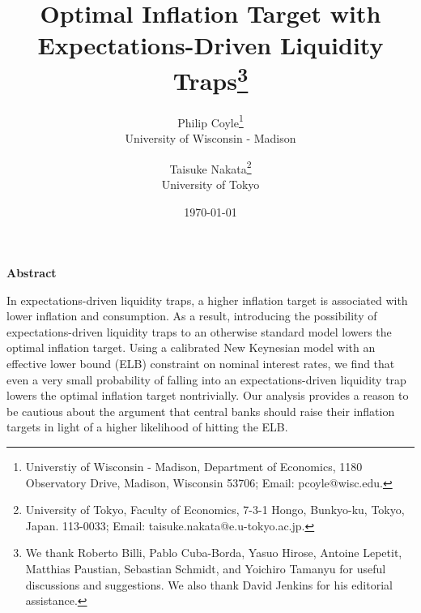 \documentclass[11pt]{article}
\begin{document}
	\title{Optimal Inflation Target with\\Expectations-Driven Liquidity Traps\footnote{We thank Roberto Billi, Pablo Cuba-Borda, Yasuo Hirose, Antoine Lepetit, Matthias Paustian, Sebastian Schmidt, and Yoichiro Tamanyu for useful discussions and suggestions. We also thank David Jenkins for his editorial assistance.}}
	\author{
		Philip Coyle\thanks{Universtiy of Wisconsin - Madison,  Department of Economics, 1180 Observatory Drive, Madison, Wisconsin 53706; Email: pcoyle@wisc.edu.}\\
		University of Wisconsin - Madison
		\and
		Taisuke Nakata\thanks{University of Tokyo, Faculty of Economics, 7-3-1 Hongo, Bunkyo-ku, Tokyo, Japan. 113-0033; Email: taisuke.nakata@e.u-tokyo.ac.jp.}\\
		University of Tokyo
	}
	\date{\mydate\today}

	\maketitle

	\vspace{-0.3in}

	\begin{center}
		\textbf{Abstract}
	\end{center}
	\noindent In expectations-driven liquidity traps, a higher inflation target is associated with lower inflation and consumption. As a result, introducing the possibility of expectations-driven liquidity traps to an otherwise standard model lowers the optimal inflation target. Using a calibrated New Keynesian model with an effective lower bound (ELB) constraint on nominal interest rates, we find that even a very small probability of falling into an expectations-driven liquidity trap lowers the optimal inflation target nontrivially. Our analysis provides a reason to be cautious about the argument that central banks should raise their inflation targets in light of a higher likelihood of hitting the ELB.
\end{document}
